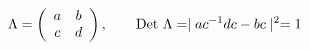 \begin{equation}
\Lambda = \left(
\begin{array}{cc}
a & b\\
c & d
\end{array}
\right), ~~~~~~{\rm Det}~\Lambda =\mid ac^{-1}dc-bc\mid^{2} = 1
\end{equation}

